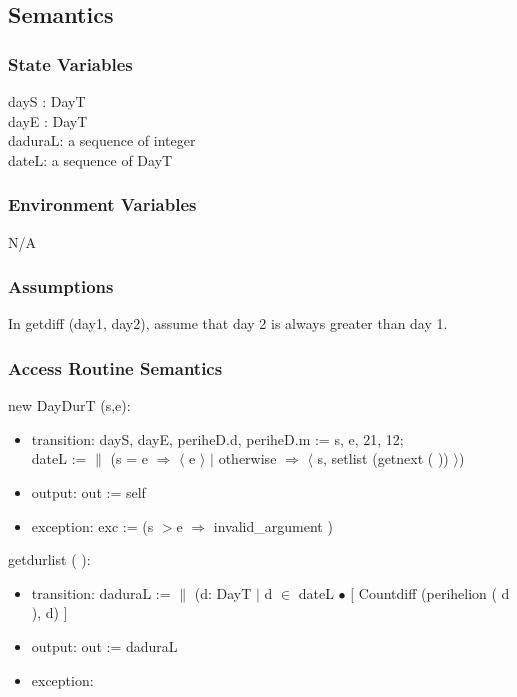 \documentclass[12pt, titlepage]{article}
\begin{document}
\subsection{Semantics}

\subsubsection{State Variables}
dayS : DayT\\
dayE : DayT\\
daduraL: a sequence of integer\\
dateL: a sequence of DayT\\
\subsubsection{Environment Variables}

N/A\\

\subsubsection{Assumptions}
In  getdiff (day1, day2), assume that day 2 is always greater than day 1.

\subsubsection{ Access Routine Semantics}

\noindent  new DayDurT (s,e):
\begin{itemize}
\item transition:  dayS, dayE, periheD.d,  periheD.m := s, e, 21, 12;\\

dateL := $\|$ (s = e $\Rightarrow$ $\langle$ e $\rangle$ $|$ otherwise $\Rightarrow$ $\langle$ s, setlist (getnext ( )) $\rangle$) 

\item output: out := self
\item exception: exc := (s $>$e $\Rightarrow$ invalid\_argument )
\end{itemize}

\noindent  getdurlist ( ):
\begin{itemize}
\item transition: daduraL := $\|$ (d: DayT $|$ d $\in$ dateL  $\bullet$ [ Countdiff (perihelion ( d ), d) ]
\item output: out := daduraL
\item exception:
\end{itemize}
\end{document}
